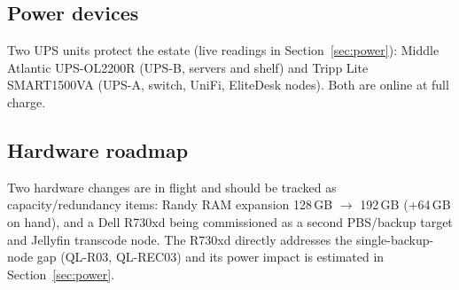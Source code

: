 \subsection{Power devices}

Two UPS units protect the estate (live readings in Section~\ref{sec:power}):
Middle Atlantic UPS-OL2200R (UPS-B, servers and shelf) and Tripp Lite SMART1500VA
(UPS-A, switch, UniFi, EliteDesk nodes). Both are online at full charge.

\subsection{Hardware roadmap}

Two hardware changes are in flight and should be tracked as capacity/redundancy items:
Randy RAM expansion 128\,GB $\rightarrow$ 192\,GB (+64\,GB on hand), and a Dell R730xd
being commissioned as a second PBS/backup target and Jellyfin transcode node. The R730xd
directly addresses the single-backup-node gap (QL-R03, QL-REC03) and its power impact is
estimated in Section~\ref{sec:power}.
